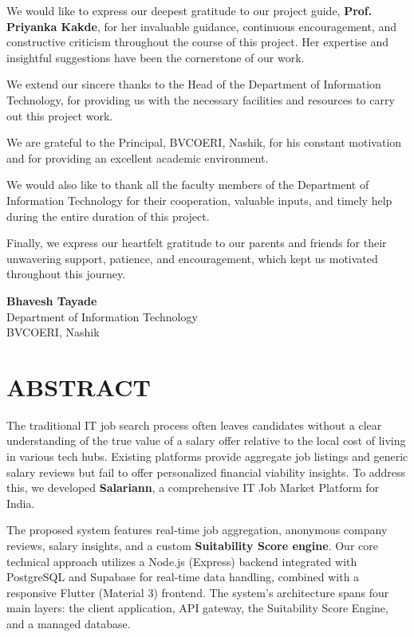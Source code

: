 We would like to express our deepest gratitude to our project guide, \textbf{Prof. Priyanka Kakde}, for her invaluable guidance, continuous encouragement, and constructive criticism throughout the course of this project. Her expertise and insightful suggestions have been the cornerstone of our work.

We extend our sincere thanks to the Head of the Department of Information Technology, for providing us with the necessary facilities and resources to carry out this project work.

We are grateful to the Principal, BVCOERI, Nashik, for his constant motivation and for providing an excellent academic environment.

We would also like to thank all the faculty members of the Department of Information Technology for their cooperation, valuable inputs, and timely help during the entire duration of this project.

Finally, we express our heartfelt gratitude to our parents and friends for their unwavering support, patience, and encouragement, which kept us motivated throughout this journey.

\vspace{2cm}
\begin{flushright}
\textbf{Bhavesh Tayade} \\
Department of Information Technology \\
BVCOERI, Nashik
\end{flushright}

\newpage
\chapter*{ABSTRACT}
The traditional IT job search process often leaves candidates without a clear understanding of the true value of a salary offer relative to the local cost of living in various tech hubs. Existing platforms provide aggregate job listings and generic salary reviews but fail to offer personalized financial viability insights. To address this, we developed \textbf{Salariann}, a comprehensive IT Job Market Platform for India. 

The proposed system features real-time job aggregation, anonymous company reviews, salary insights, and a custom \textbf{Suitability Score engine}. Our core technical approach utilizes a Node.js (Express) backend integrated with PostgreSQL and Supabase for real-time data handling, combined with a responsive Flutter (Material 3) frontend. The system's architecture spans four main layers: the client application, API gateway, the Suitability Score Engine, and a managed database. 

